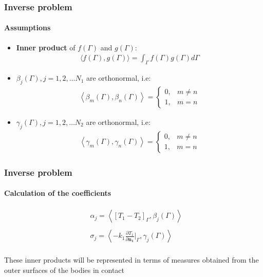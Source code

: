 \documentclass[aspectratio=169]{beamer}
\begin{document}
\begin{frame}
	\frametitle{Inverse problem}
	\framesubtitle{Assumptions}
	\begin{itemize}
		\item \textbf{Inner product} of $f(\Gamma)$ and $g(\Gamma)$:
		\begin{align*}
		 \langle f(\Gamma), g(\Gamma) \rangle = \int_{\Gamma} f(\Gamma) g(\Gamma)d\Gamma
		\end{align*}
		\item $\beta_j(\Gamma), j=1,2,\ldots N_1$ are orthonormal, i.e:
		\begin{align*}
		\left\langle  \beta_m(\Gamma), \beta_n(\Gamma) \right\rangle = \left\lbrace
		\begin{matrix}
		0, & m \neq n \\
		1, & m = n 
		\end{matrix}
		\right.
		\end{align*}
		
		\item $\gamma_j(\Gamma), j=1,2,\ldots N_2$ are orthonormal, i.e:
		\begin{align*}
		\left\langle  \gamma_m(\Gamma), \gamma_n(\Gamma) \right\rangle = \left\lbrace
		\begin{matrix}
		0, & m \neq n \\
		1, & m = n 
		\end{matrix}
		\right.
		\end{align*}
	\end{itemize}
\end{frame}
%
\begin{frame}
	\frametitle{Inverse problem}
	\framesubtitle{Calculation of the coefficients}
	\begin{alertblock}{}
	\begin{align*}
		& \alpha_j = \left\langle [T_1 - T_2]_\Gamma, \beta_j(\Gamma) \right\rangle \\ \\
		& \sigma_j = \left\langle - k_1 \frac{\partial T_1}{\partial\mathbf{n_1}}\bigg|_\Gamma, \gamma_j(\Gamma) \right\rangle \\
	\end{align*}
\end{alertblock}
	
	These inner products will be represented in terms of measures obtained from the outer surfaces of the bodies in contact
\end{frame}
%
\end{document}
